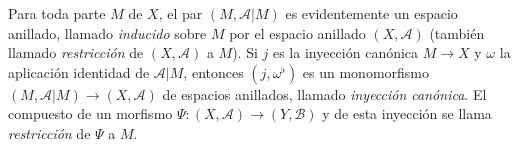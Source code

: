 \begin{env}[4.1.2]
\label{0.4.1.2-fr}
Para toda parte $M$ de $X$, el par $(M,\mathcal{A}|M)$ es evidentemente un
espacio anillado, llamado \emph{inducido} sobre $M$ por el espacio anillado
$(X,\mathcal{A})$ (también llamado \emph{restricción} de
$(X,\mathcal{A})$ a $M$). Si $j$ es la inyección canónica $M\to X$ y
$\omega$ la aplicación identidad de $\mathcal{A}|M$, entonces $(j,\omega^\flat)$
es un monomorfismo $(M,\mathcal{A}|M)\to(X,\mathcal{A})$ de espacios anillados,
llamado \emph{inyección canónica}. El compuesto de un morfismo
$\Psi:(X,\mathcal{A})\to(Y,\mathcal{B})$ y de esta inyección se llama
\emph{restricción} de $\Psi$ a $M$.
\end{env}

